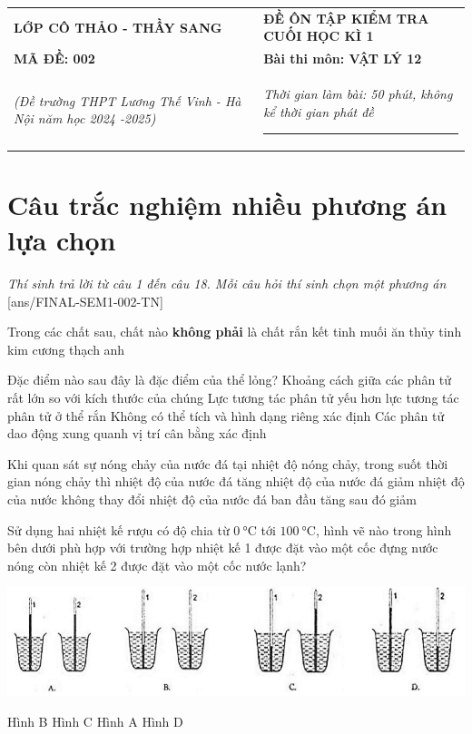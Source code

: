\begin{tabular}{M{6.5cm}M{11cm}}
	\textbf{LỚP CÔ THẢO - THẦY SANG}& \textbf{ĐỀ ÔN TẬP KIỂM TRA CUỐI HỌC KÌ 1}\\
	\textbf{MÃ ĐỀ: 002}& \textbf{Bài thi môn: VẬT LÝ 12}\\
	\textit{(Đề trường THPT Lương Thế Vinh - Hà Nội năm học 2024 -2025)}& \textit{Thời gian làm bài: 50 phút, không kể thời gian phát đề}
	
	\noindent\rule{4cm}{0.8pt} \\
\end{tabular}
\setcounter{section}{0}
\section{Câu trắc nghiệm nhiều phương án lựa chọn}
\textit{Thí sinh trả lời từ câu 1 đến câu 18. Mỗi câu hỏi thí sinh chọn một phương án}
\setcounter{ex}{0}
[ans/FINAL-SEM1-002-TN]
\begin{ex}
	Trong các chất sau, chất nào \textbf{không phải} là chất rắn kết tinh
	\choice
	{muối ăn}
	{\True thủy tinh}
	{kim cương}
	{thạch anh}
	\loigiai{}
\end{ex}
\begin{ex}
	Đặc điểm nào sau đây là đặc điểm của thể lỏng?
	\choice
	{Khoảng cách giữa các phân tử rất lớn so với kích thước của chúng}
	{\True Lực tương tác phân tử yếu hơn lực tương tác phân tử ở thể rắn}
	{Không có thể tích và hình dạng riêng xác định}
	{Các phân tử dao động xung quanh vị trí cân bằng xác định}
	\loigiai{}
\end{ex}
\begin{ex}
	Khi quan sát sự nóng chảy của nước đá tại nhiệt độ nóng chảy, trong suốt thời gian nóng chảy thì
	\choice
	{nhiệt độ của nước đá tăng}
	{nhiệt độ của nước đá giảm}
	{\True nhiệt độ của nước không thay đổi}
	{nhiệt độ của nước đá ban đầu tăng sau đó giảm}
	\loigiai{}
\end{ex}
\begin{ex}
	Sử dụng hai nhiệt kế rượu có độ chia từ $\SI{0}{\celsius}$ tới $\SI{100}{\celsius}$, hình vẽ nào trong hình bên dưới phù hợp với trường hợp nhiệt kế 1 được đặt vào một cốc đựng nước nóng còn nhiệt kế 2 được đặt vào một cốc nước lạnh?
	\begin{center}
		\includegraphics[scale=0.7]{../figs/FINAL-SEM1-002-1}
	\end{center}
	\choice
	{Hình B}
	{Hình C}
	{Hình A}
	{\True Hình D}
	\loigiai{}
\end{ex}
